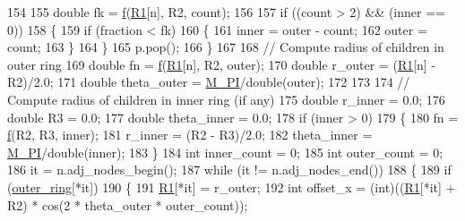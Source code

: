 \begin{DoxyCode}
154             
155                 \textcolor{keywordtype}{double} fk = \mbox{\hyperlink{rings_8cpp_a77369fc4d5326a16d2c603e032023528}{f}}(\mbox{\hyperlink{rings_8cpp_aad2cc6a2ec44dae25504cc8f1c2cff5c}{R1}}[n], R2, count);
156                 
157                 \textcolor{keywordflow}{if} ((count > 2) && (inner == 0))
158                 \{
159                     \textcolor{keywordflow}{if} (fraction < fk) 
160                     \{
161                         inner = outer - count;
162                         outer = count;
163                     \}
164                 \}
165                 p.pop();
166             \}
167             
168             \textcolor{comment}{// Compute radius of children in outer ring}
169             \textcolor{keywordtype}{double} fn = \mbox{\hyperlink{rings_8cpp_a77369fc4d5326a16d2c603e032023528}{f}}(\mbox{\hyperlink{rings_8cpp_aad2cc6a2ec44dae25504cc8f1c2cff5c}{R1}}[n], R2, outer);
170             \textcolor{keywordtype}{double} r\_outer = (\mbox{\hyperlink{rings_8cpp_aad2cc6a2ec44dae25504cc8f1c2cff5c}{R1}}[n] - R2)/2.0;
171             \textcolor{keywordtype}{double} theta\_outer = \mbox{\hyperlink{rings_8cpp_ae71449b1cc6e6250b91f539153a7a0d3}{M\_PI}}/double(outer);
172             
173             
174             \textcolor{comment}{// Compute radius of children in inner ring (if any)}
175             \textcolor{keywordtype}{double} r\_inner = 0.0;
176             \textcolor{keywordtype}{double} R3 = 0.0;
177             \textcolor{keywordtype}{double} theta\_inner = 0.0;
178             \textcolor{keywordflow}{if} (inner > 0)
179             \{
180                 fn = \mbox{\hyperlink{rings_8cpp_a77369fc4d5326a16d2c603e032023528}{f}}(R2, R3, inner);
181                 r\_inner = (R2 - R3)/2.0;
182                 theta\_inner = \mbox{\hyperlink{rings_8cpp_ae71449b1cc6e6250b91f539153a7a0d3}{M\_PI}}/double(inner);
183             \}
184             \textcolor{keywordtype}{int} inner\_count = 0;
185             \textcolor{keywordtype}{int} outer\_count = 0;
186             it = n.adj\_nodes\_begin();
187             \textcolor{keywordflow}{while} (it != n.adj\_nodes\_end())
188             \{
189                 \textcolor{keywordflow}{if} (\mbox{\hyperlink{rings_8cpp_a2813a60dd1c26fe13eb1970f25012d8c}{outer\_ring}}[*it])
190                 \{
191                     \mbox{\hyperlink{rings_8cpp_aad2cc6a2ec44dae25504cc8f1c2cff5c}{R1}}[*it] = r\_outer;
192                     \textcolor{keywordtype}{int} offset\_x = (int)((\mbox{\hyperlink{rings_8cpp_aad2cc6a2ec44dae25504cc8f1c2cff5c}{R1}}[*it] + R2) * cos(2 * theta\_outer * outer\_count));

\end{DoxyCode}
